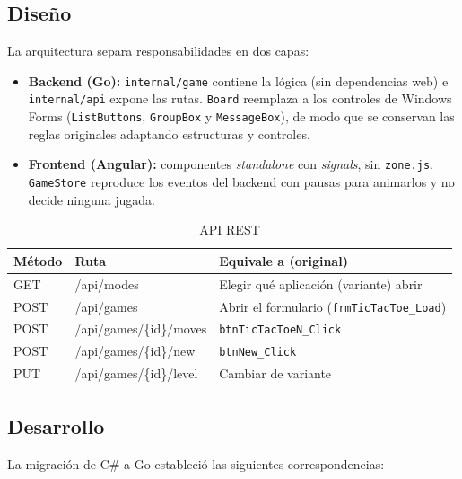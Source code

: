 \documentclass[12pt,a4paper]{article}
\begin{document}
\subsection{Diseño}
La arquitectura separa responsabilidades en dos capas:
\begin{itemize}
  \item \textbf{Backend (Go):} \texttt{internal/game} contiene la lógica
        (sin dependencias web) e \texttt{internal/api} expone las rutas.
        \texttt{Board} reemplaza a los controles de Windows Forms
        (\texttt{ListButtons}, \texttt{GroupBox} y \texttt{MessageBox}), de modo
        que se conservan las reglas originales adaptando estructuras y controles.
  \item \textbf{Frontend (Angular):} componentes \emph{standalone} con
        \emph{signals}, sin \texttt{zone.js}. \texttt{GameStore} reproduce los
        eventos del backend con pausas para animarlos y no decide ninguna jugada.
\end{itemize}

\begin{table}[H]
\centering
\caption{API REST}
\begin{tabular}{p{1.7cm}p{5.9cm}p{6.1cm}}
\toprule
\textbf{Método} & \textbf{Ruta} & \textbf{Equivale a (original)}\\
\midrule
GET & /api/modes & Elegir qué aplicación (variante) abrir\\
POST & /api/games & Abrir el formulario (\texttt{frmTicTacToe\_Load})\\
POST & /api/games/\{id\}/moves & \texttt{btnTicTacToeN\_Click}\\
POST & /api/games/\{id\}/new & \texttt{btnNew\_Click}\\
PUT & /api/games/\{id\}/level & Cambiar de variante\\
\bottomrule
\end{tabular}
\end{table}

\subsection{Desarrollo}
La migración de C\# a Go estableció las siguientes correspondencias:
\end{document}
